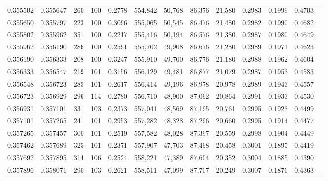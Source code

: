 \begin{tabular}{rrrrrrrrrrrrr}
0.355502 & 0.355647 &   260 & 100 &                                     0.2778 & 554,842 &  50,768 &  86,376 &  21,580 & 0.2983 & 0.1999 & 0.4703 \\
0.355650 & 0.355797 &   223 & 100 &                                     0.3096 & 555,065 &  50,545 &  86,476 &  21,480 & 0.2982 & 0.1990 & 0.4682 \\
0.355802 & 0.355962 &   351 & 100 &                                     0.2217 & 555,416 &  50,194 &  86,576 &  21,380 & 0.2987 & 0.1980 & 0.4649 \\
0.355962 & 0.356190 &   286 & 100 &                                     0.2591 & 555,702 &  49,908 &  86,676 &  21,280 & 0.2989 & 0.1971 & 0.4623 \\
0.356190 & 0.356333 &   208 & 100 &                                     0.3247 & 555,910 &  49,700 &  86,776 &  21,180 & 0.2988 & 0.1962 & 0.4604 \\
0.356333 & 0.356547 &   219 & 101 &                                     0.3156 & 556,129 &  49,481 &  86,877 &  21,079 & 0.2987 & 0.1953 & 0.4583 \\
0.356548 & 0.356723 &   285 & 101 &                                     0.2617 & 556,414 &  49,196 &  86,978 &  20,978 & 0.2989 & 0.1943 & 0.4557 \\
0.356723 & 0.356929 &   296 & 114 &                                     0.2780 & 556,710 &  48,900 &  87,092 &  20,864 & 0.2991 & 0.1933 & 0.4530 \\
0.356931 & 0.357101 &   331 & 103 &                                     0.2373 & 557,041 &  48,569 &  87,195 &  20,761 & 0.2995 & 0.1923 & 0.4499 \\
0.357101 & 0.357265 &   241 & 101 &                                     0.2953 & 557,282 &  48,328 &  87,296 &  20,660 & 0.2995 & 0.1914 & 0.4477 \\
0.357265 & 0.357457 &   300 & 101 &                                     0.2519 & 557,582 &  48,028 &  87,397 &  20,559 & 0.2998 & 0.1904 & 0.4449 \\
0.357462 & 0.357689 &   325 & 101 &                                     0.2371 & 557,907 &  47,703 &  87,498 &  20,458 & 0.3001 & 0.1895 & 0.4419 \\
0.357692 & 0.357895 &   314 & 106 &                                     0.2524 & 558,221 &  47,389 &  87,604 &  20,352 & 0.3004 & 0.1885 & 0.4390 \\
0.357896 & 0.358071 &   290 & 103 &                                     0.2621 & 558,511 &  47,099 &  87,707 &  20,249 & 0.3007 & 0.1876 & 0.4363 \\

\end{tabular}
